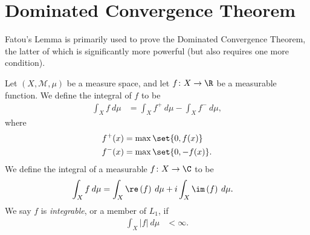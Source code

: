 \documentclass[12pt]{mypackage}
\begin{document}
\section{Dominated Convergence Theorem}%
Fatou's Lemma is primarily used to prove the Dominated Convergence Theorem, the latter of which is significantly more powerful (but also requires one more condition).
\begin{definition}
  Let $\left( X,\mathcal{M},\mu \right)$ be a measure space, and let $f\colon X\rightarrow \R$ be a measurable function. We define the integral of $f$ to be
  \begin{align*}
    \int_{X}^{} f\:d\mu &= \int_{X}^{} f^{+}\:d\mu - \int_{X}^{} f^{-}\:d\mu,
  \end{align*}
  where
  \begin{align*}
    f^{+}(x) &= \max\set{0,f(x)}\\
    f^{-}(x) &= \max\set{0,-f(x)}.
  \end{align*}
  We define the integral of a measurable $f\colon X\rightarrow \C$ to be
  \begin{align*}
    \int_{X}^{} f\:d\mu &= \int_{X}^{} \re\left( f \right)\:d\mu + i\int_{X}^{} \im\left( f \right)\:d\mu.
  \end{align*}
  We say $f$ is \textit{integrable}, or a member of $L_1$, if
  \begin{align*}
    \int_{X}^{} \left\vert f \right\vert\:d\mu &< \infty.
  \end{align*}
\end{definition}
\end{document}
